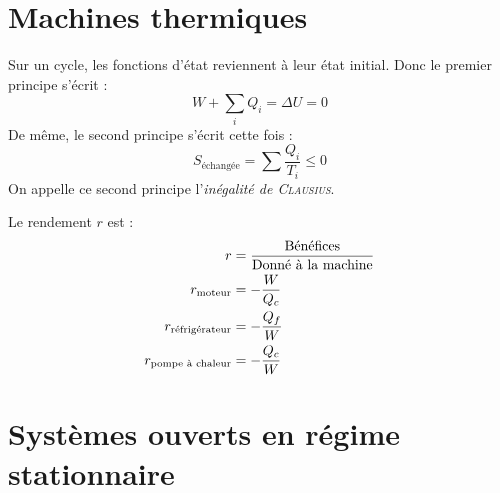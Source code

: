 \documentclass[11pt,a4paper,fleqn,pdftex]{report}
\begin{document}
\section{Machines thermiques} %
\label{sec:machines_thermiques}
\begin{theorem}
   Sur un cycle, les fonctions d'état reviennent à leur état initial. Donc le premier principe s'écrit : 
   \begin{equation}
   W + \sum_i Q_i = \Delta U = 0
   \end{equation}
   De même, le second principe s'écrit cette fois : 
   \begin{equation}
   S_\text{échangée} = \sum \dfrac{Q_i}{T_i} \le 0
   \end{equation}
   On appelle ce second principe l'\emph{inégalité de \textsc{Clausius}}.
\end{theorem}
\begin{theorem}[Rendement]
   Le rendement $r$ est :
   \begin{subequations}
   \begin{align}
   r &= \dfrac{\text{Bénéfices}}{\text{Donné à la machine}} \notag \\
   r_\text{moteur}  &= -\dfrac{W}{Q_c} \\
   r_\text{réfrigérateur}  &= -\dfrac{Q_f}{W} \\
   r_\text{pompe à chaleur}  &= -\dfrac{Q_c}{W}
   \end{align}
   \end{subequations}
\end{theorem}
\section{Systèmes ouverts en régime stationnaire} %
\label{sec:systemes_ouverts}
\end{document}
